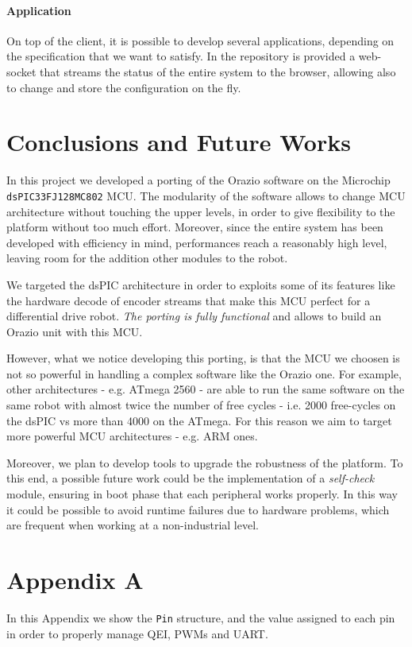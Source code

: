 \documentclass[10pt,a4paper, notitlepage]{report}
\begin{document}
\paragraph{Application} On top of the client, it is possible to develop several applications, depending on the specification that we want to satisfy. In the repository is provided a web-socket that streams the status of the entire system to the browser, allowing also to change and store the configuration on the fly. 

\section*{Conclusions and Future Works} \label{sec:conclusions}
In this project we developed a porting of the Orazio software on the Microchip \texttt{dsPIC33FJ128MC802} MCU.
The modularity of the software allows to change MCU architecture without touching the upper levels, in order to give flexibility to the platform without too much effort. Moreover, since the entire system has been developed with efficiency in mind, performances reach a reasonably high level, leaving room for the addition other modules to the robot.

We targeted the dsPIC architecture in order to exploits some of its features like the hardware decode of encoder streams that make this MCU perfect for a differential drive robot. \textit{The porting is fully functional} and allows to build an Orazio unit with this MCU.

However, what  we notice developing this porting, is that the MCU we choosen is not so powerful in handling a complex software like the Orazio one. For example, other architectures - e.g. ATmega 2560 - are able to run the same software on the same robot with almost twice the number of free cycles - i.e. 2000 free-cycles on the dsPIC vs more than 4000 on the ATmega. For this reason we aim to target more powerful MCU architectures - e.g. ARM ones. 

Moreover, we plan to develop tools to upgrade the robustness of the platform. To this end, a possible future work could be the implementation of a \textit{self-check} module, ensuring in boot phase that each peripheral works properly. In this way it could be possible to avoid runtime failures due to hardware problems, which are frequent when working at a non-industrial level.

\newpage
\section*{Appendix A} \label{sec:appendix}
In this Appendix we show the \texttt{Pin} structure, and the value assigned to each pin in order to properly manage QEI, PWMs and UART. 
\end{document}
